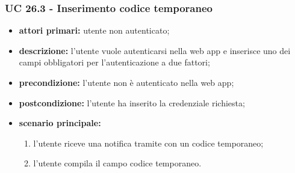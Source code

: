 		\subsubsection{UC 26.3 - Inserimento codice temporaneo}
		\begin{itemize}
			\item \textbf{attori primari:} utente non autenticato;
			\item \textbf{descrizione:} l'utente vuole autenticarsi nella web app e inserisce uno dei campi obbligatori per l'autenticazione a due fattori;
			\item \textbf{precondizione:} l'utente non è autenticato nella web app;
			\item \textbf{postcondizione:} l'utente ha inserito la credenziale richiesta;
			\item \textbf{scenario principale:}
			\begin{enumerate}
				\item l'utente riceve una notifica tramite  con un codice temporaneo;
				\item l'utente compila il campo codice temporaneo.
			\end{enumerate}
		\end{itemize}	
